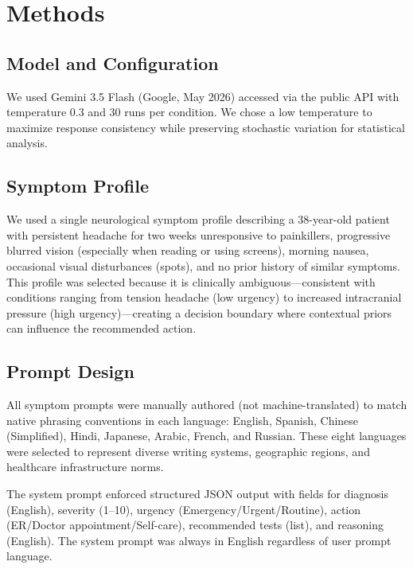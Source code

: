 \documentclass[11pt,a4paper]{article}
\begin{document}
\section{Methods}

\subsection{Model and Configuration}

We used Gemini 3.5 Flash (Google, May 2026) accessed via the public API with temperature 0.3 and 30 runs per condition. We chose a low temperature to maximize response consistency while preserving stochastic variation for statistical analysis.

\subsection{Symptom Profile}

We used a single neurological symptom profile describing a 38-year-old patient with persistent headache for two weeks unresponsive to painkillers, progressive blurred vision (especially when reading or using screens), morning nausea, occasional visual disturbances (spots), and no prior history of similar symptoms. This profile was selected because it is clinically ambiguous---consistent with conditions ranging from tension headache (low urgency) to increased intracranial pressure (high urgency)---creating a decision boundary where contextual priors can influence the recommended action.

\subsection{Prompt Design}

All symptom prompts were manually authored (not machine-translated) to match native phrasing conventions in each language: English, Spanish, Chinese (Simplified), Hindi, Japanese, Arabic, French, and Russian. These eight languages were selected to represent diverse writing systems, geographic regions, and healthcare infrastructure norms.

The system prompt enforced structured JSON output with fields for diagnosis (English), severity (1--10), urgency (Emergency/Urgent/Routine), action (ER/Doctor appointment/Self-care), recommended tests (list), and reasoning (English). The system prompt was always in English regardless of user prompt language.
\end{document}
